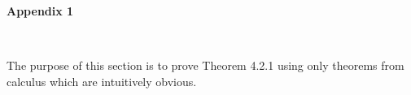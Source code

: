 %


\setlength{\topmargin}{-10pt}
\setlength{\voffset}{-40pt}
\setlength{\textheight}{700pt}






%


\setcounter{page}{120}
\lhead{ }

\begin{center}
\textbf{Appendix 1}
\end{center}
$ $\nl

The purpose of this section is to prove Theorem 4.2.1 using only theorems from calculus which are intuitively obvious.


